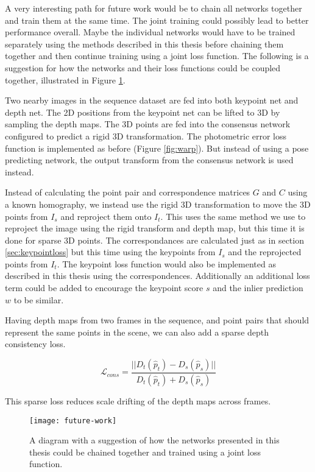 A very interesting path for future work would be to chain all networks together and train them at the same time. The joint training could possibly lead to better performance overall. Maybe the individual networks would have to be trained separately using the methods described in this thesis before chaining them together and then continue training using a joint loss function. The following is a suggestion for how the networks and their loss functions could be coupled together, illustrated in Figure \ref{fig:futurework}.

Two nearby images in the sequence dataset are fed into both keypoint net and depth net. The 2D positions from the keypoint net can be lifted to 3D by sampling the depth maps. The 3D points are fed into the consensus network configured to predict a rigid 3D transformation. The photometric error loss function is implemented as before (Figure \ref{fig:warp}). But instead of using a pose predicting network, the output transform from the consensus network is used instead.

Instead of calculating the point pair and correspondence matrices $G$ and $C$ using a known homography, we instead use the rigid 3D transformation to move the 3D points from $I_s$ and reproject them onto $I_t$. This uses the same method we use to reproject the image using the rigid transform and depth map, but this time it is done for sparse 3D points. The correspondances are calculated just as in section \ref{sec:keypointloss} but this time using the keypoints from $I_s$ and the reprojected points from $I_t$. The keypoint loss function would also be implemented as described in this thesis using the correspondences. Additionally an additional loss term could be added to encourage the keypoint score $s$ and the inlier prediction $w$ to be similar.

Having depth maps from two frames in the sequence, and point pairs that should represent the same points in the scene, we can also add a sparse depth consistency loss.

\[
\mathcal{L}_{cons}=\frac{
||D_t(\hat{p}_t) - D_s(\hat{p}_s)||
}{
D_t(\hat{p}_t) + D_s(\hat{p}_s)
}
\]

This sparse loss reduces scale drifting of the depth maps across frames.

\begin{figure}[H]
	\centering
	\texttt{[image: future-work]}
	\caption{A diagram with a suggestion of how the networks presented in this thesis could be chained together and trained using a joint loss function.}
	\label{fig:futurework}
\end{figure}
